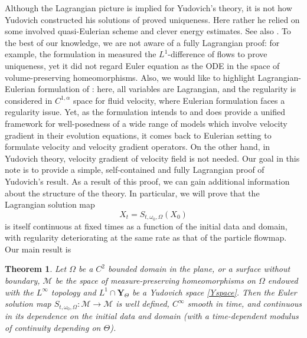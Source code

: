 \documentclass[12pt]{article}
\newtheorem{theorem}{Theorem}
\begin{document}
Although the Lagrangian picture is implied for Yudovich's theory, it is not how Yudovich constructed his solutions of proved uniqueness.  Here rather he relied on some involved quasi-Eulerian scheme and clever energy estimates. See also \cite{CS24}. To the best of our knowledge, we are not aware of a fully Lagrangian proof: for example, the formulation in \cite{MP} measured the $L^1$-difference of flows to prove uniqueness, yet it did not regard Euler equation as the ODE in the space of volume-preserving homeomorphisms. Also, we would like to highlight Lagrangian-Eulerian formulation of \cite{C}: here, all variables are Lagrangian, and the regularity is considered in $C^{1,\alpha}$ space for fluid velocity, where Eulerian formulation faces a regularity issue. Yet, as the formulation intends to and does provide a unified framework for well-posedness of a wide range of models which involve velocity gradient in their evolution equations, it comes back to Eulerian setting to formulate velocity and velocity gradient operators. On the other hand, in Yudovich theory, velocity gradient of velocity field is not needed. Our goal in this note is to provide a simple, self-contained and fully Lagrangian proof of Yudovich's result.  As a result of this proof, we can gain additional information about the structure of the theory.  In particular, we will prove that the Lagrangian solution map 
\begin{equation}
X_t = S_{t,\omega_0, \Omega}(X_0)
\end{equation}
is itself continuous at fixed times as a function of the initial data and domain, with regularity deteriorating at the same rate as that of the particle flowmap. Our main result is
\begin{theorem}
Let $\Omega$ be a $C^2$ bounded domain in the plane, or a surface without boundary, $\mathcal{M}$ be the space of measure-preserving homeomorphisms on $\Omega$  endowed with the $L^\infty$ topology and $L^1\cap\mathbf{Y}_{\Theta}$ be a Yudovich space  \eqref{Yspace}. Then the Euler solution map $S_{t,\omega_0, \Omega}:\mathcal{M}\rightarrow \mathcal{M} $ is well defined, $C^\infty$ smooth in time,  and  continuous  in its dependence on the initial data and domain (with a time-dependent modulus of continuity depending on $\Theta$).
\end{theorem}
\end{document}
